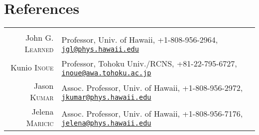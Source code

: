 \documentclass[a4paper,10pt]{article} %
\begin{document}

\section{References}

\begin{tabular}{rp{12cm}}
\multicolumn{2}{c}{}\\
John G. \textsc{Learned} & Professor, Univ. of Hawaii, +1-808-956-2964,
\href{mailto:jgl@phys.hawaii.edu}{\nolinkurl{jgl@phys.hawaii.edu}}\\

Kunio \textsc{Inoue} & Professor, Tohoku Univ./RCNS, +81-22-795-6727,
\href{mailto:inoue@awa.tohoku.ac.jp}{\nolinkurl{inoue@awa.tohoku.ac.jp}}\\

Jason \textsc{Kumar} & Assoc. Professor, Univ. of Hawaii, +1-808-956-2972,
\href{mailto:jkumar@phys.hawaii.edu}{\nolinkurl{jkumar@phys.hawaii.edu}}\\

Jelena \textsc{Maricic} & Assoc. Professor, Univ. of Hawaii, +1-808-956-7176,
\href{mailto:jelena@phys.hawaii.edu}{\nolinkurl{jelena@phys.hawaii.edu}}\\

\end{tabular}

\end{document}
